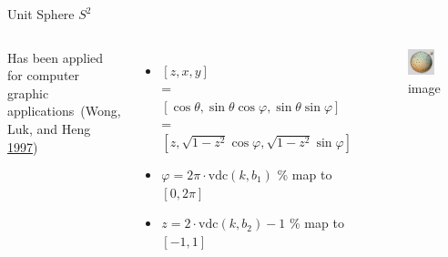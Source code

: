 \begin{frame}{Unit Sphere \(S^2\)}
\protect\hypertarget{unit-sphere-s2}{}

\begin{columns}


Has been applied for computer graphic applications~(Wong, Luk, and Heng
\protect\hyperlink{ref-wong1997sampling}{1997})

\begin{itemize}
\item
  \([z, x, y]\)\\
  = \([\cos\theta, \sin\theta\cos\varphi, \sin\theta\sin\varphi]\)\\
  = \([z, \sqrt{1-z^2}\cos\varphi, \sqrt{1-z^2}\sin\varphi]\)
\item
  \(\varphi = 2\pi\cdot\mathrm{vdc}(k,b_1)\) \% map to \([0,2\pi]\)
\item
  \(z = 2\cdot\mathrm{vdc}(k,b_2) - 1\) \% map to \([-1,1]\)
\end{itemize}


\begin{figure}
\centering
\includegraphics[width=0.8\textwidth,height=\textheight]{thammer.png}
\caption{image}
\end{figure}

\end{columns}

\end{frame}

